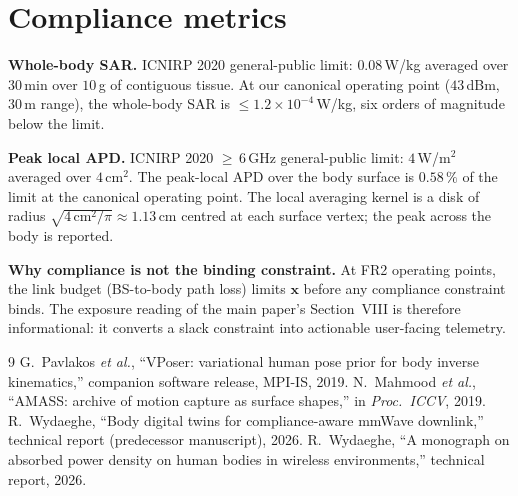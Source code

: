 \documentclass[10pt,journal,twocolumn]{IEEEtran}
\newcommand{\xx}{\mathbf{x}}
\theoremstyle{plain}
\theoremstyle{definition}
\begin{document}
\section{Compliance metrics}\label{si:compliance}

\textbf{Whole-body SAR.} ICNIRP 2020 general-public limit:
$0.08\,$W/kg averaged over $30\,$min over $10\,$g of contiguous
tissue. At our canonical operating point ($43\,$dBm, $30\,$m
range), the whole-body SAR is $\leq 1.2 \times 10^{-4}\,$W/kg,
six orders of magnitude below the limit.

\textbf{Peak local APD.} ICNIRP 2020 ${\geq}\,6\,$GHz general-public
limit: $4\,$W/m$^{2}$ averaged over $4\,$cm$^{2}$. The peak-local
APD over the body surface is $0.58\,\%$ of the limit at the
canonical operating point. The local averaging kernel is a disk
of radius $\sqrt{4\,\mathrm{cm}^{2}/\pi} \approx 1.13\,$cm centred
at each surface vertex; the peak across the body is reported.

\textbf{Why compliance is not the binding constraint.} At FR2
operating points, the link budget (BS-to-body path loss) limits
$\xx$ before any compliance constraint binds. The exposure reading
of the main paper's Section~VIII is therefore informational: it
converts a slack constraint into actionable user-facing telemetry.


\begin{thebibliography}{9}
 G.~Pavlakos \emph{et al.}, ``VPoser:
variational human pose prior for body inverse kinematics,''
companion software release, MPI-IS, 2019.
 N.~Mahmood \emph{et al.}, ``AMASS: archive of
motion capture as surface shapes,'' in \emph{Proc.\ ICCV}, 2019.
 R.~Wydaeghe, ``Body digital twins for
compliance-aware mmWave downlink,'' technical report (predecessor
manuscript), 2026.
 R.~Wydaeghe, ``A monograph on absorbed
power density on human bodies in wireless environments,'' technical
report, 2026.
\end{thebibliography}
\end{document}
